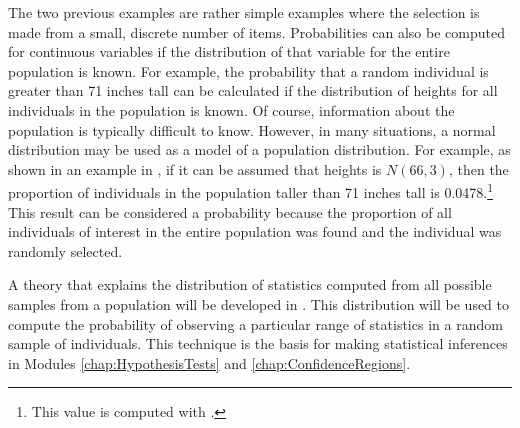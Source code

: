 \documentclass[10pt,openany]{book}\usepackage[]{graphicx}\usepackage[]{color}
\begin{document}

The two previous examples are rather simple examples where the selection is made from a small, discrete number of items.  Probabilities can also be computed for continuous variables if the distribution of that variable for the entire population is known.  For example, the probability that a random individual is greater than 71 inches tall can be calculated if the distribution of heights for all individuals in the population is known.  Of course, information about the population is typically difficult to know.  However, in many situations, a normal distribution may be used as a model of a population distribution.  For example, as shown in an example in , if it can be assumed that heights is $N(66,3)$, then the proportion of individuals in the population taller than 71 inches tall is 0.0478.\footnote{This value is computed with .}  This result can be considered a probability because the proportion of all individuals of interest in the entire population was found and the individual was randomly selected.


A theory that explains the distribution of statistics computed from all possible samples from a population will be developed in .  This distribution will be used to compute the probability of observing a particular range of statistics in a random sample of individuals.  This technique is the basis for making statistical inferences in Modules \ref{chap:HypothesisTests} and \ref{chap:ConfidenceRegions}.
\end{document}
